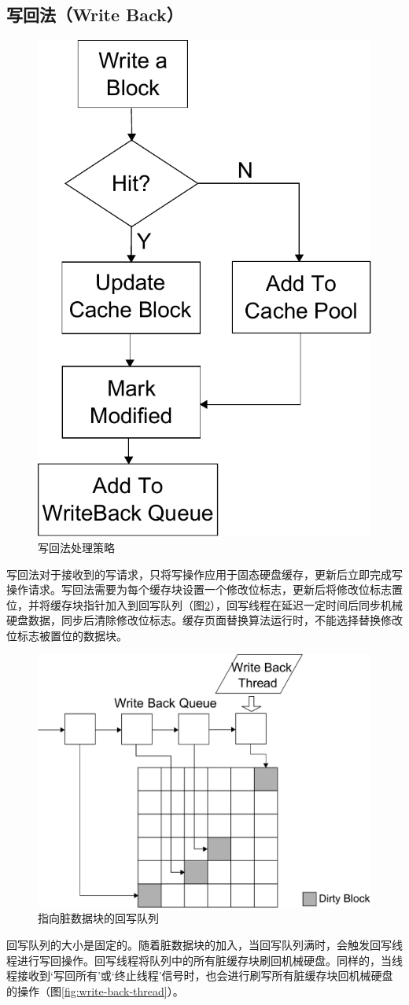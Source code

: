 \subsection{写回法（Write Back）}
\begin{figure}[!htb]
\centering
\includegraphics[width=0.4\linewidth]{./graph/write-back}
\caption{写回法处理策略}
\label{fig:write-back}
\end{figure}

写回法\cite{writeback2008}对于接收到的写请求，只将写操作应用于固态硬盘缓存，更新后立即完成写操作请求。写回法需要为每个缓存块设置一个修改位标志，更新后将修改位标志置位，并将缓存块指针加入到回写队列（图\ref{fig:write-back-queue}），回写线程在延迟一定时间后同步机械硬盘数据，同步后清除修改位标志。缓存页面替换算法运行时，不能选择替换修改位标志被置位的数据块。

\begin{figure}[H]
\centering
\includegraphics[width=0.6\linewidth]{./graph/write-back-queue}
\caption{指向脏数据块的回写队列}
\label{fig:write-back-queue}
\end{figure}

回写队列的大小是固定的。随着脏数据块的加入，当回写队列满时，会触发回写线程进行写回操作。回写线程将队列中的所有脏缓存块刷回机械硬盘。同样的，当线程接收到‘写回所有’或‘终止线程’信号时，也会进行刷写所有脏缓存块回机械硬盘的操作（图\ref{fig:write-back-thread}）。

